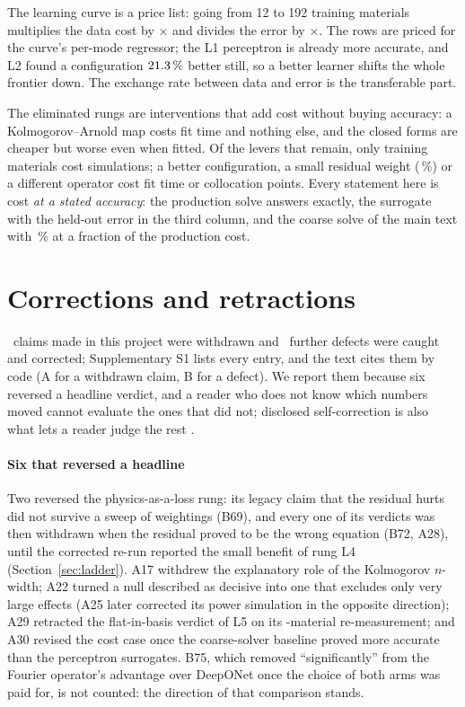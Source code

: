 The learning curve is a price list: going from 12 to 192 training materials
multiplies the data cost by \nCostDataRatio{}\(\times\) and divides the error by
\nLCratio{}\(\times\). The rows are priced for the curve's per-mode regressor; the L1
perceptron is already more accurate, and L2 found a configuration
\(21.3\,\%\) better still, so a better learner shifts the whole frontier
down. The exchange rate between data and error is the transferable part.

The eliminated rungs are interventions that add cost without buying accuracy: a
Kolmogorov--Arnold map costs fit time and nothing else, and the closed forms are
cheaper but worse even when fitted. Of the levers that remain, only training materials
cost simulations; a better configuration, a small residual weight
(\nLfourbMatGainPct\,\%) or a different operator cost fit time or collocation points.
Every statement here is cost \emph{at a stated accuracy}: the production solve answers
exactly, the surrogate with the held-out error in the third column, and the coarse solve of
the main text with \nScrCoNr\,\% at a fraction of the production cost.


\section{Corrections and retractions}

\label{s2:sec:corrections}

\nLedgerA\ claims made in this project were withdrawn and \nLedgerB\ further defects
were caught and corrected; Supplementary S1 lists every entry, and the text cites them
by code (A for a withdrawn claim, B for a defect). We report them because six reversed
a headline verdict, and a reader who does not know which numbers moved cannot evaluate
the ones that did not; disclosed self-correction is also what lets a reader judge the
rest \cite{rohrer2021loss}.

\paragraph{Six that reversed a headline} Two reversed the physics-as-a-loss rung: its
legacy claim that the residual hurts did not survive a sweep of weightings (B69), and
every one of its verdicts was then withdrawn when the residual proved to be the wrong
equation (B72, A28), until the corrected re-run reported the small benefit of
rung L4 (Section~\ref{sec:ladder}). A17 withdrew the explanatory role of the Kolmogorov
\(n\)-width; A22 turned a null described as decisive into one that excludes only very
large effects (A25 later corrected its power simulation in the opposite direction);
A29 retracted the flat-in-basis verdict of L5 on its \nNclustFolds-material
re-measurement; and A30 revised the cost case once the coarse-solver baseline proved
more accurate than the perceptron surrogates. B75, which removed ``significantly'' from
the Fourier operator's advantage over DeepONet once the choice of both arms was paid
for, is not counted: the direction of that comparison stands.

